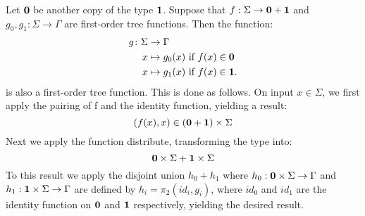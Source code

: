 \bigskip
\noindent \begin{example} Let $\mathbf{0}$ be another copy of the type $\mathbf{1}$. Suppose that $f : \Sigma \to \mathbf{0}+\mathbf{1}$ and $g_0, g_1 : \Sigma \to\Gamma$ are first-order tree functions. Then the function:
 \begin{align*}
  g\colon \Sigma &\to \Gamma \\
  x &\mapsto g_0(x)  \text{ if } f(x)\in\mathbf{0}\\
  x &\mapsto g_1(x)  \text{ if } f(x)\in\mathbf{1}.
\end{align*}
 is also a first-order tree function. This is done as follows. On input
$x\in\Sigma$, we first apply the pairing of f and the identity function, yielding a result:
$$ (f(x),x)\in(\mathbf{0}+\mathbf{1})\times\Sigma$$
Next we apply the function distribute, transforming the type into:
$$ \mathbf{0}\times\Sigma+\mathbf{1}\times\Sigma$$
To this result we apply the disjoint union $h_0 + h_1$ where $h_0:\mathbf{0}\times\Sigma\to \Gamma$ and
$h_1:\mathbf{1}\times\Sigma\to \Gamma$ are defined by $h_i=\pi_2(id_i,g_i)$, where $id_0$ and $id_1$ are the identity function on $\mathbf{0}$ and $\mathbf{1}$ respectively, yielding the desired result.
\end{example}



